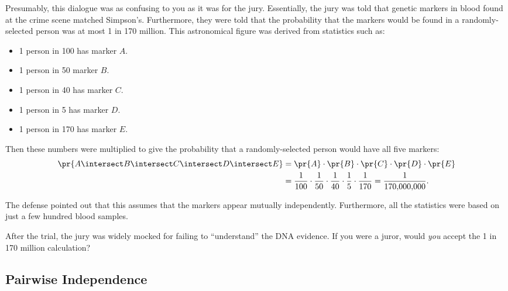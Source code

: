 Presumably, this dialogue was as confusing to you as it was for the
jury.  Essentially, the jury was told that genetic markers in blood
found at the crime scene matched Simpson's.  Furthermore, they were
told that the probability that the markers would be found in a
randomly-selected person was at most 1 in 170 million.  This
astronomical figure was derived from statistics such as:
%
\begin{itemize}
\item 1 person in 100 has marker $A$.
\item 1 person in 50 marker $B$.
\item 1 person in 40 has marker $C$.
\item 1 person in 5 has marker $D$.
\item 1 person in 170 has marker $E$.
\end{itemize}
%
Then these numbers were multiplied to give the probability that a
randomly-selected person would have all five markers:
\begin{align*}
\pr{A \intersect B \intersect C \intersect D \intersect E}
    & = \pr{A} \cdot \pr{B} \cdot \pr{C} \cdot \pr{D} \cdot \pr{E}\\
    & = \frac{1}{100} \cdot \frac{1}{50} \cdot \frac{1}{40}
                     \cdot \frac{1}{5} \cdot \frac{1}{170}
     = \frac{1}{170{,}000{,}000}.
\end{align*}

\iffalse
\begin{align*}
\pr{A \intersect B \intersect C \intersect D \intersect E}
    & = \pr{A} \cdot \pr{B} \cdot \pr{C} \cdot \pr{D} \cdot \pr{E} \\[2pt]
    & = \frac{1}{100} \cdot \frac{1}{50} \cdot \frac{1}{40}
                      \cdot \frac{1}{5} \cdot \frac{1}{170} \\[2pt]
    & = \frac{1}{170{,}000{,}000}.
\end{align*}
\fi
%
The defense pointed out that this assumes that the markers appear
mutually independently.  Furthermore, all the statistics were based on
just a few hundred blood samples.  

After the trial, the jury was widely mocked for failing to
``understand'' the DNA evidence.  If you were a juror, would
\emph{you} accept the 1 in 170 million calculation?

\subsection{Pairwise Independence}

